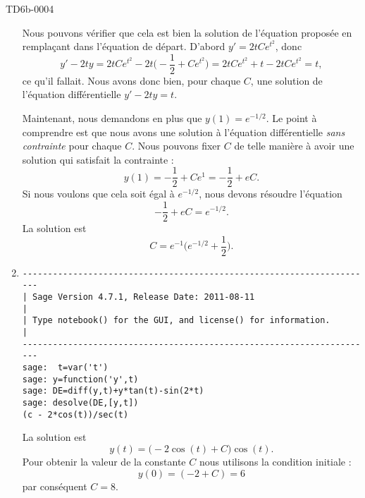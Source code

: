 \begin{corrige}{TD6b-0004}
\begin{enumerate}
			Nous pouvons vérifier que cela est bien la solution de l'équation proposée en remplaçant dans l'équation de départ. D'abord $y'=2tC e^{t^2}$, donc
			\begin{equation}
				y'-2ty=2tC e^{t^2}-2t\big( -\frac{ 1 }{2}+C e^{t^2} \big)=2tC e^{t^2}+t-2tC e^{t^2}=t,
			\end{equation}
			ce qu'il fallait. Nous avons donc bien, pour chaque $C$, une solution de l'équation différentielle $y'-2ty=t$.

			Maintenant, nous demandons en plus que $y(1)= e^{-1/2}$. Le point à comprendre est que nous avons une solution à l'équation différentielle \emph{sans contrainte} pour chaque $C$. Nous pouvons fixer $C$ de telle manière à avoir une solution qui satisfait la contrainte :
			\begin{equation}
				y(1)=-\frac{ 1 }{2}+C e^{1}=-\frac{ 1 }{2}+eC.
			\end{equation}
			Si nous voulons que cela soit égal à $ e^{-1/2}$, nous devons résoudre l'équation
			\begin{equation}
				-\frac{ 1 }{2}+eC= e^{-1/2}.
			\end{equation}
			La solution est
			\begin{equation}
				C= e^{-1}\big(  e^{-1/2}+\frac{ 1 }{2} \big).
			\end{equation}
		\item

            \begin{verbatim}
----------------------------------------------------------------------
| Sage Version 4.7.1, Release Date: 2011-08-11                       |
| Type notebook() for the GUI, and license() for information.        |
----------------------------------------------------------------------
sage:  t=var('t')
sage: y=function('y',t)
sage: DE=diff(y,t)+y*tan(t)-sin(2*t)
sage: desolve(DE,[y,t])       
(c - 2*cos(t))/sec(t)
            \end{verbatim}
            La solution est 
            \begin{equation}
                y(t)=\big( -2\cos(t)+C \big)\cos(t).
            \end{equation}
            Pour obtenir la valeur de la constante \( C\) nous utilisons la condition initiale :
            \begin{equation}
                y(0)=(-2+C)=6
            \end{equation}
            par conséquent \( C=8\).


\end{enumerate}
\end{corrige}
